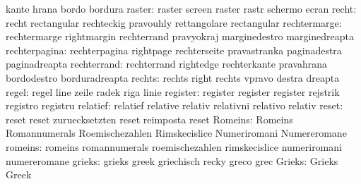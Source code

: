                            kante                     hrana
                           bordo                     bordura
                   raster: raster                    screen
                           raster                    rastr
                           schermo                   ecran
                    recht: recht                     rectangular
                           rechteckig                pravouhly
                           rettangolare              rectangular
             rechtermarge: rechtermarge              rightmargin
                           rechterrand               pravyokraj
                           marginedestro             marginedreapta
            rechterpagina: rechterpagina             rightpage
                           rechterseite              pravastranka
                           paginadestra              paginadreapta
              rechterrand: rechterrand               rightedge
                           rechterkante              pravahrana
                           bordodestro               borduradreapta
                   rechts: rechts                    right
                           rechts                    vpravo
                           destra                    dreapta
                    regel: regel                     line
                           zeile                     radek
                           riga                      linie
                 register: register                  register
                           register                  rejstrik
                           registro                  registru
                 relatief: relatief                  relative
                           relativ                   relativni
                           relativo                  relativ
                    reset: reset                     reset
                           zuruecksetzten            reset
                           reimposta                 reset
                  Romeins: Romeins                   Romannumerals
                           Roemischezahlen           Rimskecislice
                           Numeriromani              Numereromane
                  romeins: romeins                   romannumerals
                           roemischezahlen           rimskecislice
                           numeriromani              numereromane
                   grieks: grieks                    greek
                           griechisch                recky
                           greco                     grec
                   Grieks: Grieks                    Greek
